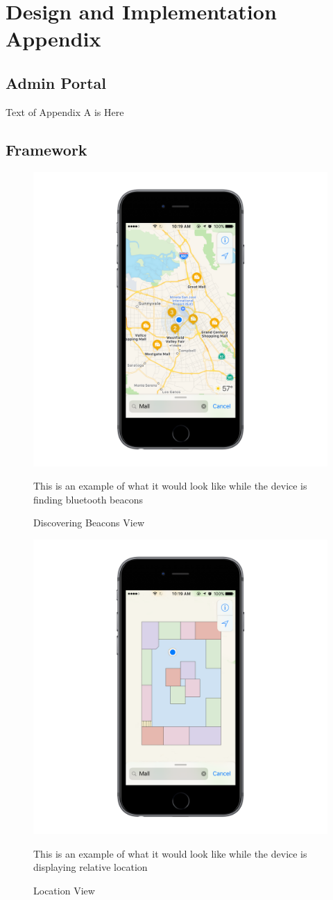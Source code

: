\appendix
\chapter{Design and Implementation Appendix}
\section{Admin Portal}

Text of Appendix A is Here

\section{Framework}
\begin{figure}
\includegraphics[width=1\textwidth]{images/con1.png}
\caption{Discovering Beacons View}
This is an example of what it would look like while the device is finding bluetooth beacons
\end{figure}
\begin{figure}
\includegraphics[width=1\textwidth]{images/con2.png}
\caption{Location View}
This is an example of what it would look like while the device is displaying relative location
\end{figure}
